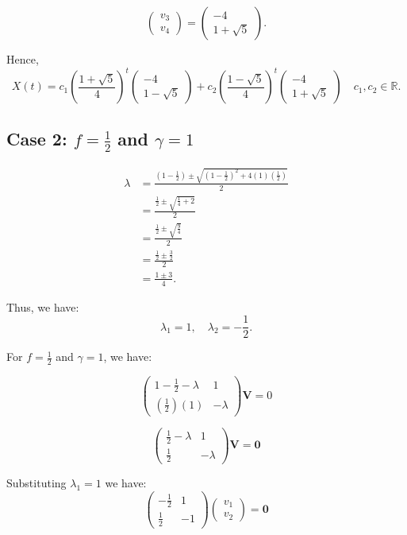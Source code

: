 \documentclass [a4paper]{article}
\begin{document}
\[
\begin{pmatrix} v_3 \\ v_4 \end{pmatrix} = \begin{pmatrix} -4 \\ 1 + \sqrt{5}\end{pmatrix}.
\]

Hence, 
\[ X(t) = c_1{\left(\frac{1 + \sqrt{5}}{4}\right)}^t\begin{pmatrix}
    -4 \\ 1-\sqrt{5}
\end{pmatrix} + c_2{\left(\frac{1 - \sqrt{5}}{4}\right)}^t\begin{pmatrix}
    -4 \\ 1 +\sqrt{5}
\end{pmatrix} \quad c_1,c_2 \in \mathbb{R}.\]

\subsection*{Case 2: \( f = \frac{1}{2} \) and \( \gamma = 1 \)}

\begin{align*}
   \lambda &= \frac{\left(1 - \frac{1}{2}\right) \pm \sqrt{\left(1 - \frac{1}{2}\right)^2 + 4 \left(1\right) \left(\frac{1}{2}\right)}}{2} \\
   &= \frac{\frac{1}{2} \pm \sqrt{\frac{1}{4} + 2}}{2} \\
   &= \frac{\frac{1}{2} \pm \sqrt{\frac{9}{4}}}{2} \\
   &= \frac{\frac{1}{2} \pm \frac{3}{2}}{2} \\
   &= \frac{1 \pm 3}{4}.
\end{align*}

Thus, we have: 
\[
   \lambda_1 = 1, \quad \lambda_2 = -\frac{1}{2}.
\]

For \(f = \frac{1}{2}\) and \(\gamma = 1\), we have: 

\[
     \begin{pmatrix} 1 - \frac{1}{2} - \lambda & 1 \\ \left(\frac{1}{2}\right) \left(1\right) & -\lambda \end{pmatrix}\mathbf{V} = 0
\]

\[
\begin{pmatrix} \frac{1}{2} - \lambda & 1 \\ \frac{1}{2} & -\lambda \end{pmatrix} \mathbf{V} = \mathbf{0}
\]

Substituting \(\lambda_1 = 1\) we have:
\[
\begin{pmatrix} -\frac{1}{2}  &  1 \\ \frac{1}{2} & -1 \end{pmatrix} \begin{pmatrix} v_1 \\ v_2 \end{pmatrix} = \mathbf{0}
\]
\end{document}
